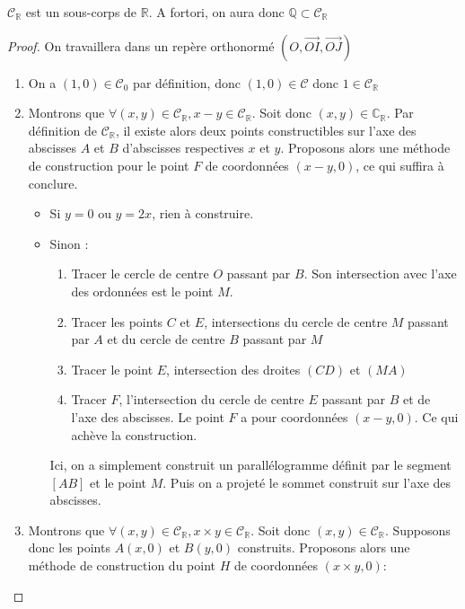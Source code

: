 \documentclass[a4paper,12pt,french,draft]{report}
\begin{document}
			
		\begin{proposition} \( \mathscr{C}_\mathbb{R} \) est un sous-corps de \(\mathbb{R}\). A fortori, on aura donc \( \mathbb{Q} \subset \mathscr{C}_\mathbb{R} \)
		\end{proposition}
			\begin{proof}
				On travaillera dans un repère orthonormé $(O, \vec{OI}, \vec{OJ})$
				\begin{enumerate}
					\item On a $(1, 0) \in \mathscr{C}_0$ par définition, donc $(1, 0) \in \mathscr{C}$ donc $1 \in \mathscr{C}_\mathbb{R}$
					\item Montrons que $\forall (x, y) \in \mathscr{C}_\mathbb{R}, x-y \in \mathscr{C}_\mathbb{R}$. Soit donc $(x, y) \in \mathbb{C}_\mathbb{R}$. Par définition de $\mathscr{C}_\mathbb{R}$, il existe alors deux points constructibles sur l'axe des abscisses $A$ et $B$ d'abscisses respectives $x$ et $y$. Proposons alors une méthode de construction pour le point $F$ de coordonnées $(x-y, 0)$, ce qui suffira à conclure.
						\begin{itemize}
							\item Si $y = 0$ ou $y = 2x$, rien à construire.
							\item Sinon : 
								\begin{enumerate}
									\item Tracer le cercle de centre $O$ passant par $B$. Son intersection avec l'axe des ordonnées est le point $M$.
									\item Tracer les points $C$ et $E$, intersections du cercle de centre $M$ passant par $A$ et du cercle de centre $B$ passant par $M$
									\item Tracer le point $E$, intersection des droites $(CD)$ et $(MA)$
									\item Tracer $F$, l'intersection du cercle de centre $E$ passant par $B$ et de l'axe des abscisses. Le point $F$ a pour coordonnées $(x-y, 0)$. Ce qui achève la construction.	
								\end{enumerate}
								Ici, on a simplement construit un parallélogramme définit par le segment $[AB]$ et le point $M$. Puis on a projeté le sommet construit sur l'axe des abscisses.
						\end{itemize}
					\item Montrons que \( \forall (x, y) \in \mathscr{C}_\mathbb{R}, x \times y \in \mathscr{C}_\mathbb{R}\). Soit donc $(x, y) \in \mathscr{C}_\mathbb{R}$. Supposons donc les points $A (x, 0)$ et $B (y, 0)$ construits. Proposons alors une méthode de construction du point $H$ de coordonnées $(x\times y, 0)$:

\end{enumerate}
\end{proof}
\end{document}
